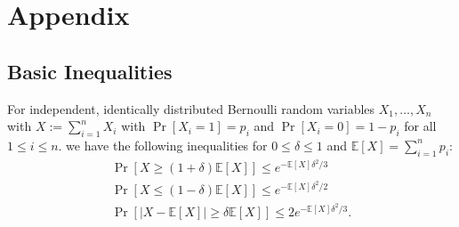 \chapter{Appendix}
\section{Basic Inequalities}
\begin{lemma}
For independent, identically distributed Bernoulli random variables $X_1, \dots, X_n$ with $X := \sum_{i=1}^n X_i$
with $\Pr[X_i = 1] = p_i$ and $\Pr[X_i = 0] = 1 - p_i$ for all $ 1 \leq  i \leq n$.
we have the following inequalities for $0 \leq \delta \leq 1$ and $\mathbb{E}[X] = \sum_{i=1}^{n} p_i$:
\begin{gather}
\label{ineq:ch0}
\Pr[X \geq (1+\delta) \mathbb{E}[X]] \leq e^{- \mathbb{E}[X] \delta^2/3} \\
\label{ineq:ch1}
\Pr[X \leq (1-\delta) \mathbb{E}[X]] \leq e^{- \mathbb{E}[X] \delta^2/2} \\
\label{ineq:ch2}
\Pr[|X - \mathbb{E}[X]| \geq \delta \mathbb{E}[X]] \leq 2 e^{- \mathbb{E}[X] \delta^2 / 3}.
\end{gather}
\end{lemma}